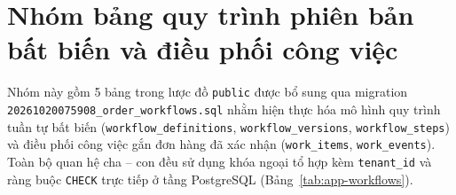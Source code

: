 \section{Nhóm bảng quy trình phiên bản bất biến và điều phối công việc}
Nhóm này gồm 5 bảng trong lược đồ \texttt{public} được bổ sung qua migration \texttt{20261020075908\_\hspace{0pt}order\_\hspace{0pt}workflows.sql} nhằm hiện thực hóa mô hình quy trình tuần tự bất biến (\texttt{workflow\_\hspace{0pt}definitions}, \texttt{workflow\_\hspace{0pt}versions}, \texttt{workflow\_\hspace{0pt}steps}) và điều phối công việc gắn đơn hàng đã xác nhận (\texttt{work\_\hspace{0pt}items}, \texttt{work\_\hspace{0pt}events}). Toàn bộ quan hệ cha -- con đều sử dụng khóa ngoại tổ hợp kèm \texttt{tenant\_\hspace{0pt}id} và ràng buộc \texttt{CHECK} trực tiếp ở tầng PostgreSQL (Bảng~\ref{tab:app-workflows}).


